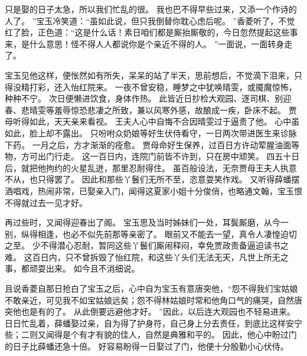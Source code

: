 只是娶的日子太急，所以我们忙乱的很。
我也巴不得早些过来，又添一个作诗的人了。
”宝玉冷笑道：“虽如此说，但只我倒替你耽心虑后呢。
”香菱听了，不觉红了脸，正色道：“这是什么话！素日咱们都是厮抬厮敬的，今日忽然提起这些事来，是什么意思！怪不得人人都说你是个亲近不得的人。
”一面说，一面转身走了。
\par
宝玉见他这样，便怅然如有所失，呆呆的站了半天，思前想后，不觉滴下泪来，只得没精打彩，还入怡红院来。
一夜不曾安稳，睡梦之中犹唤晴雯，或魇魔惊怖，种种不宁。
次日便懒进饮食，身体作热。
此皆近日抄检大观园、逐司棋、别迎春、悲晴雯等羞辱惊恐悲凄之所致，兼以风寒外感，故酿成一疾，卧床不起。
贾母听得如此，天天亲来看视。
王夫人心中自悔不合因晴雯过于逼责了他。
心中虽如此，脸上却不露出。
只吩咐众奶娘等好生伏侍看守，一日两次带进医生来诊脉下药。
一月之后，方才渐渐的痊愈。
贾母命好生保养，过百日方许动荤腥油面等物，方可出门行走。
这一百日内，连院门前皆不许到，只在房中顽笑。
四五十日后，就把他拘约的火星乱迸，那里忍耐得住。
虽百般设法，无奈贾母王夫人执意不从，也只得罢了。
因此和那些丫鬟们无所不至，恣意耍笑作戏。
又听得薛蟠摆酒唱戏，热闹非常，已娶亲入门，闻得这夏家小姐十分俊俏，也略通文翰，宝玉恨不得就过去一见才好。
\par
再过些时，又闻得迎春出了阁。
宝玉思及当时姊妹们一处，耳鬓厮磨，从今一别，纵得相逢，也必不似先前那等亲密了。
眼前又不能去一望，真令人凄惶迫切之至。
少不得潜心忍耐，暂同这些丫鬟们厮闹释闷，幸免贾政责备逼迫读书之难。
这百日内，只不曾拆毁了怡红院，和这些丫头们无法无天，凡世上所无之事，都顽耍出来。
如今且不消细说。
\par
且说香菱自那日抢白了宝玉之后，心中自为宝玉有意唐突他，“怨不得我们宝姑娘不敢亲近，可见我不如宝姑娘远矣；怨不得林姑娘时常和他角口气的痛哭，自然唐突他也是有的了。
从此倒要远避他才好。
”因此，以后连大观园也不轻易进来。
日日忙乱着，薛蟠娶过亲，自为得了护身符，自己身上分去责任，到底比这样安宁些；二则又闻得是个有才有貌的佳人，自然是典雅和平的。
因此，他心中盼过门的日子比薛蟠还急十倍。
好容易盼得一日娶过了门，他便十分殷勤小心伏侍。
